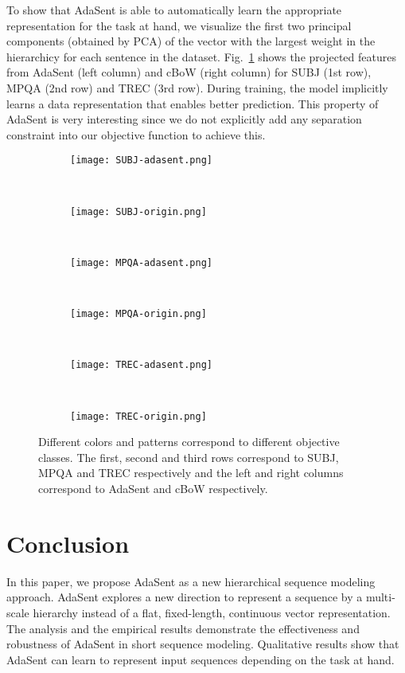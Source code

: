 \documentclass{article}
\theoremstyle{definition}
\begin{document}
To show that AdaSent is able to automatically learn the appropriate representation for the task at hand, we visualize the first two principal components (obtained by PCA) of the vector with the largest weight in the hierarchicy for each sentence in the dataset.
Fig.~\ref{fig:pca} shows the projected features from AdaSent (left column) and cBoW (right column) for SUBJ (1st row), MPQA (2nd row) and TREC (3rd row). During training, the model implicitly learns a data representation that enables better prediction. This property of AdaSent is very interesting since we do not explicitly add any separation constraint into our objective function to achieve this.
\begin{figure}[htb]
\centering
\begin{subfigure}[b]{0.44\linewidth}
	\centering
	\texttt{[image: SUBJ-adasent.png]}
\end{subfigure}
~
\begin{subfigure}[b]{0.44\linewidth}
	\centering
	\texttt{[image: SUBJ-origin.png]}
\end{subfigure}
~
\begin{subfigure}[b]{0.44\linewidth}
	\centering
	\texttt{[image: MPQA-adasent.png]}	
\end{subfigure}
~
\begin{subfigure}[b]{0.44\linewidth}
	\centering
	\texttt{[image: MPQA-origin.png]}
\end{subfigure}
~
\begin{subfigure}[b]{0.44\linewidth}
	\centering
	\texttt{[image: TREC-adasent.png]}	
\end{subfigure}
~
\begin{subfigure}[b]{0.44\linewidth}
	\centering
	\texttt{[image: TREC-origin.png]}
\end{subfigure}
\caption{Different colors and patterns correspond to different objective classes. The first, second and third rows correspond to SUBJ, MPQA and TREC respectively and the left and right columns correspond to AdaSent and cBoW respectively.}
\label{fig:pca}
\end{figure}

\section{Conclusion}
\label{sec:conclusion}
In this paper, we propose AdaSent as a new hierarchical sequence modeling approach. AdaSent explores a new direction to represent a sequence by a multi-scale hierarchy instead of a flat, fixed-length, continuous vector representation. The analysis and the empirical results demonstrate the effectiveness and robustness of AdaSent in short sequence modeling. Qualitative results show that AdaSent can learn to represent input sequences depending on the task at hand.
\end{document}
